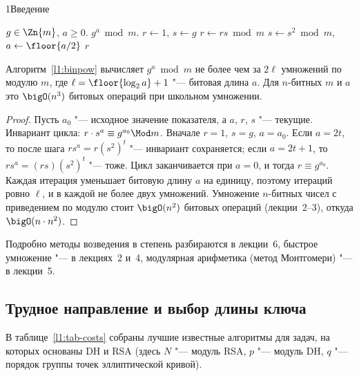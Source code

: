 \begin{lecture}{1}{Введение}
\begin{algorithm}\label{l1:binpow}
\begin{algorithmic}[1]
\Require $g \in \Zn{m}$, $a \ge 0$.
\Ensure $g^a \bmod m$.
\State $r \gets 1$, \quad $s \gets g$
   \State $r \gets r s \bmod m$ \EndIf
  \State $s \gets s^2 \bmod m$, \quad $a \gets \floor{a/2}$
\EndWhile
\State \Return $r$
\end{algorithmic}
\end{algorithm}

\begin{proposition}\label{l1:binpow-cost}
Алгоритм~\ref{l1:binpow} вычисляет $g^a \bmod m$ не более чем за $2\ell$ умножений по
модулю $m$, где $\ell = \floor{\log_2 a} + 1$ "--- битовая длина $a$. Для $n$-битных $m$ и $a$
это $\bigO(n^3)$ битовых операций при школьном умножении.
\end{proposition}

\begin{proof}
Пусть $a_0$ "--- исходное значение показателя, а $a$, $r$, $s$ "--- текущие. Инвариант
цикла: $r \cdot s^{a} \equiv g^{a_0} \Mod m$. Вначале $r = 1$, $s = g$, $a = a_0$. Если
$a = 2t$, то после шага $r s^a = r (s^2)^t$ "--- инвариант сохраняется; если $a = 2t + 1$, то
$r s^a = (rs)(s^2)^t$ "--- тоже. Цикл заканчивается при $a = 0$, и тогда $r \equiv g^{a_0}$.
Каждая итерация уменьшает битовую длину $a$ на единицу, поэтому итераций ровно $\ell$, и в каждой
не более двух умножений. Умножение $n$-битных чисел с приведением по модулю стоит $\bigO(n^2)$
битовых операций (лекции~2--3), откуда $\bigO(n \cdot n^2)$.
\end{proof}

Подробно методы возведения в степень разбираются в лекции~6, быстрое умножение "--- в лекциях~2
и~4, модулярная арифметика (метод Монтгомери) "--- в лекции~5.

\subsection{Трудное направление и выбор длины ключа}

В таблице~\ref{l1:tab-costs} собраны лучшие известные алгоритмы для задач, на которых
основаны DH и RSA (здесь $N$ "--- модуль RSA, $p$ "--- модуль DH, $q$ "--- порядок группы точек
эллиптической кривой).


\end{lecture}
